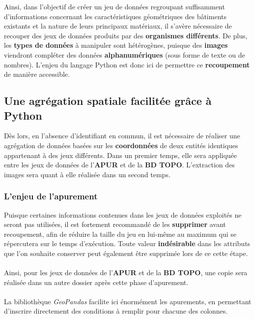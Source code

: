 \documentclass[
  11pt,
  french,
]{article}
\begin{document}
\hfill\break
\hfill\break
Ainsi, dans l'objectif de créer un jeu de données regroupant
suffisamment d'informations concernant les caractéristiques géométriques
des bâtiments existants et la nature de leurs principaux matériaux, il
s'avère nécessaire de recouper des jeux de données produits par des
\textbf{organismes différents}. De plus, les \textbf{types de données} à
manipuler sont hétérogènes, puisque des \textbf{images} viendront
compléter des données \textbf{alphanumériques} (sous forme de texte ou
de nombres). L'enjeu du langage Python est donc ici de permettre ce
\textbf{recoupement} de manière accessible.

\newpage

\hypertarget{une-agruxe9gation-spatiale-facilituxe9e-gruxe2ce-uxe0-python}{%
\subsection{Une agrégation spatiale facilitée grâce à
Python}\label{une-agruxe9gation-spatiale-facilituxe9e-gruxe2ce-uxe0-python}}

Dès lors, en l'absence d'identifiant en commun, il est nécessaire de
réaliser une agrégation de données basées sur les \textbf{coordonnées}
de deux entités identiques appartenant à des jeux différents. Dans un
premier temps, elle sera appliquée entre les jeux de données de
l'\textbf{APUR} et de la \textbf{BD TOPO}. L'extraction des images sera
quant à elle réalisée dans un second temps.

\newpage

\hypertarget{lenjeu-de-lapurement}{%
\subsubsection{L'enjeu de l'apurement}\label{lenjeu-de-lapurement}}

Puisque certaines informations contenues dans les jeux de données
exploités ne seront pas utilisées, il est fortement recommandé de les
\textbf{supprimer} avant recoupement, afin de réduire la taille du jeu
en lui-même au maximum qui se répercutera sur le temps d'exécution.
Toute valeur \textbf{indésirable} dans les attributs que l'on souhaite
conserver peut également être supprimée lors de ce cette étape.\\
~\\
Ainsi, pour les jeux de données de l'\textbf{APUR} et de la \textbf{BD
TOPO}, une copie sera réalisée dans un autre dossier après cette phase
d'apurement.\\
~\\
La bibliothèque \emph{GeoPandas} facilite ici énormément les apurements,
en permettant d'inscrire directement des conditions à remplir pour
chacune des colonnes.
\end{document}
